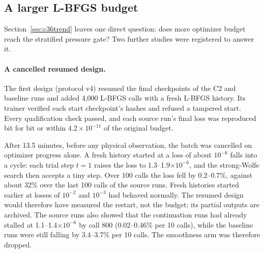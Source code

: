 \documentclass[11pt]{article}
\begin{document}
\subsection{A larger L-BFGS budget}\label{sec:c36v5}
Section~\ref{sec:c36trend} leaves one direct question: does more optimizer
budget reach the stratified pressure gate? Two further studies were
registered to answer it.

\paragraph{A cancelled resumed design.}
The first design (protocol v4) resumed the final checkpoints of the C2 and
baseline runs and added 4,000 L-BFGS calls with a fresh L-BFGS history. Its
trainer verified each start checkpoint's hashes and refused a tampered
start. Every qualification check passed, and each source run's final loss
was reproduced bit for bit or within $4.2\times10^{-11}$ of the original
budget.

After 13.5 minutes, before any physical observation, the batch was
cancelled on optimizer progress alone. A fresh history started at a loss of
about $10^{-6}$ falls into a cycle: each trial step $t=1$ raises the loss to
1.3--1.9$\times10^{-6}$, and the strong-Wolfe search then accepts a tiny
step. Over 100 calls the loss fell by 0.2--0.7\%, against about 32\% over
the last 100 calls of the source runs. Fresh histories started earlier at
losses of $10^{-2}$ and $10^{-3}$ had behaved normally. The resumed design
would therefore have measured the restart, not the budget; its partial
outputs are archived. The source runs also showed that the continuation runs
had already stalled at 1.1--1.4$\times10^{-6}$ by call 800 (0.02--0.46\% per
10 calls), while the baseline runs were still falling by 3.4--3.7\% per 10
calls. The smoothness arm was therefore dropped.
\end{document}
